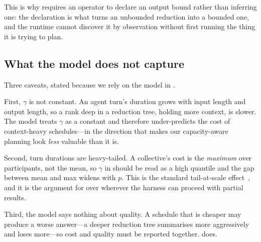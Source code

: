This is why \ampi{} requires an operator to declare an output bound rather
than inferring one: the declaration is what turns an unbounded reduction
into a bounded one, and the runtime cannot discover it by observation
without first running the thing it is trying to plan.

\subsection{What the model does not capture}

Three caveats, stated because we rely on the model in .

First, $\gamma$ is not constant. An agent turn's duration grows with input
length and output length, so a rank deep in a reduction tree, holding more
context, is slower. The model treats $\gamma$ as a constant and therefore
under-predicts the cost of context-heavy schedules---in the direction that
makes our capacity-aware planning look \emph{less} valuable than it is.

Second, turn durations are heavy-tailed. A collective's cost is the
\emph{maximum} over participants, not the mean, so $\gamma$ in
 should be read as a high quantile and the gap between mean
and max widens with $p$. This is the standard tail-at-scale
effect~\cite{Dean2013}, and it is the argument for  over
 wherever the harness can proceed with partial results.

Third, the model says nothing about quality. A schedule that is cheaper may
produce a worse answer---a deeper reduction tree summarises more
aggressively and loses more---so cost and quality must be reported together.
 does.
